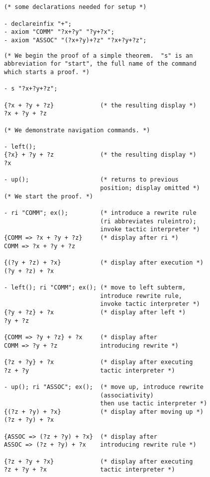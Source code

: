 \documentclass{kluwer}
\begin{document}
\begin{article}
\begin{verbatim}


(* some declarations needed for setup *)

- declareinfix "+";
- axiom "COMM" "?x+?y" "?y+?x";
- axiom "ASSOC" "(?x+?y)+?z" "?x+?y+?z";
\end{verbatim}

\newpage

\begin{verbatim}
(* We begin the proof of a simple theorem.  "s" is an 
abbreviation for "start", the full name of the command 
which starts a proof. *)

- s "?x+?y+?z";

{?x + ?y + ?z}             (* the resulting display *)
?x + ?y + ?z

(* We demonstrate navigation commands. *)

- left();  	
{?x} + ?y + ?z             (* the resulting display *)
?x

- up();                    (* returns to previous 
                           position; display omitted *)
(* We start the proof. *)

- ri "COMM"; ex();         (* introduce a rewrite rule 
                           (ri abbreviates ruleintro);
                           invoke tactic interpreter *)
{COMM => ?x + ?y + ?z}     (* display after ri *)
COMM => ?x + ?y + ?z

{(?y + ?z) + ?x}           (* display after execution *)
(?y + ?z) + ?x

- left(); ri "COMM"; ex(); (* move to left subterm, 
                           introduce rewrite rule, 
                           invoke tactic interpreter *)
{?y + ?z} + ?x             (* display after left *)
?y + ?z

{COMM => ?y + ?z} + ?x     (* display after
COMM => ?y + ?z            introducing rewrite *)

{?z + ?y} + ?x             (* display after executing 
?z + ?y                    tactic interpreter *)

- up(); ri "ASSOC"; ex();  (* move up, introduce rewrite
                           (associativity)
                           then use tactic interpreter *)
{(?z + ?y) + ?x}           (* display after moving up *)
(?z + ?y) + ?x

{ASSOC => (?z + ?y) + ?x}  (* display after 
ASSOC => (?z + ?y) + ?x    introducing rewrite rule *)

{?z + ?y + ?x}             (* display after executing 
?z + ?y + ?x               tactic interpreter *)


\end{verbatim}
\end{article}
\end{document}
